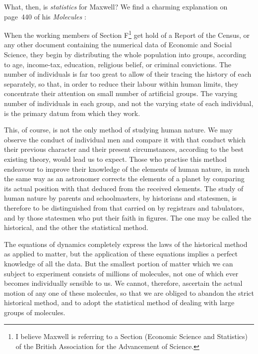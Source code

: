 \documentclass[\ifafour a4paper,12pt,\else a5paper,10pt,\fi%
onecolumn,oneside,article,%
british%
]{memoir}
\theoremstyle{remark}
\theoremstyle{innote}
\newcommand*{\citey}{\parencites*}
\renewcommand*{\|}{\nonscript\,\vert\nonscript\;\mathopen{}}
\newenvironment{myquote}{\medskip\begin{adjustwidth}{\parindent}{\parindent}\small}{\end{adjustwidth}\medskip}
\begin{document}
What, then, is \emph{statistics} for Maxwell? We find a charming
explanation on page~440 of his \emph{Molecules} \citey{maxwell1873c}:
\begin{myquote}
  When the working members of Section F\footnote{I believe Maxwell is
    referring to a Section (Economic Science and Statistics) of the British
    Association for the Advancement of Science.} get hold of a Report of
  the Census, or any other document containing the numerical data of
  Economic and Social Science, they begin by distributing the whole
  population into groups, according to age, income-tax, education,
  religious belief, or criminal convictions. The number of individuals is
  far too great to allow of their tracing the history of each separately,
  so that, in order to reduce their labour within human limits, they
  concentrate their attention on small number of artificial groups. The
  varying number of individuals in each group, and not the varying state of
  each individual, is the primary datum from which they work.\par This, of
  course, is not the only method of studying human nature. We may observe
  the conduct of individual men and compare it with that conduct which
  their previous character and their present circumstances, according to
  the best existing theory, would lead us to expect. Those who practise
  this method endeavour to improve their knowledge of the elements of human
  nature, in much the same way as an astronomer corrects the elements of a
  planet by comparing its actual position with that deduced from the
  received elements. The study of human nature by parents and
  schoolmasters, by historians and statesmen, is therefore to be
  distinguished from that carried on by registrars and tabulators, and by
  those statesmen who put their faith in figures. The one may be called the
  historical, and the other the statistical method.\par The equations of
  dynamics completely express the laws of the historical method as applied
  to matter, but the application of these equations implies a perfect
  knowledge of all the data. But the smallest portion of matter which we
  can subject to experiment consists of millions of molecules, not one of
  which ever becomes individually sensible to us. We cannot, therefore,
  ascertain the actual motion of any one of these molecules, so that we are
  obliged to abandon the strict historical method, and to adopt the
  statistical method of dealing with large groups of molecules.
\end{myquote}
\end{document}
